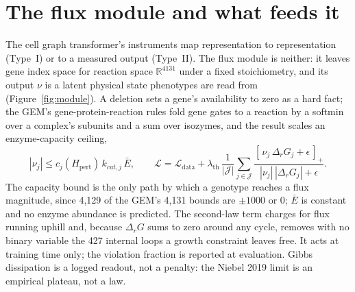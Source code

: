 
\section{The flux module and what feeds it}
\label{sec:module}

The cell graph transformer's instruments map representation to representation (Type~I) or
to a measured output (Type~II). The flux module is neither: it leaves gene index space for
reaction space $\mathbb{R}^{4131}$ under a fixed stoichiometry, and its output $\nu$ is a
latent physical state phenotypes are read from (Figure~\ref{fig:module}). A deletion sets a
gene's availability to zero as a hard fact; the GEM's gene-protein-reaction rules fold gene
gates to a reaction by a softmin over a complex's subunits and a sum over isozymes, and the
result scales an enzyme-capacity ceiling,
\begin{equation}
  |\nu_j| \le c_j(H_{\mathrm{pert}})\, k_{cat,j}\,\bar E,
  \qquad
  \mathcal{L} = \mathcal{L}_{\mathrm{data}}
  + \lambda_{\mathrm{th}}\,\frac{1}{|\mathcal{J}|}\sum_{j\in\mathcal{J}}
    \frac{[\,\nu_j\,\Delta_r G_j + \epsilon\,]_{+}}{|\nu_j|\,|\Delta_r G_j| + \epsilon}.
  \label{eq:module}
\end{equation}
The capacity bound is the only path by which a genotype reaches a flux magnitude, since
4{,}129 of the GEM's 4{,}131 bounds are $\pm1000$ or $0$; $\bar E$ is constant and no
enzyme abundance is predicted. The second-law term charges for flux running uphill and,
because $\Delta_r G$ sums to zero around any cycle, removes with no binary variable the 427
internal loops a growth constraint leaves free. It acts at training time only; the violation
fraction is reported at evaluation. Gibbs dissipation is a logged readout, not a
penalty: the Niebel 2019 limit is an empirical plateau, not a law.

